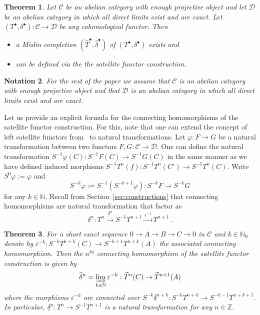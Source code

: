 \documentclass[12pt,a4paper]{article}
\numberwithin{equation}{section}
\newtheorem{thm}{Theorem}[section]
\newtheorem{notn}[thm]{Notation}
\theoremstyle{nonumberplain}
\begin{document}
\begin{thm}\label{thm:satellitemislin}
Let $\mathcal{C}$ be an abelian category with enough projective object and let $\mathcal{D}$ be an abelian category in which all direct limits exist and are exact. Let $(T^{\bullet}, \delta^{\bullet}): \mathcal{C} \rightarrow \mathcal{D}$ be any cohomological functor.  Then
\begin{itemize}
\item a Mislin completion $(\widehat{T}^{\bullet}, \widehat{\delta}^{\bullet})$ of $(T^{\bullet}, \delta^{\bullet})$ exists and
\item can be defined via the the satellite functor construction.
\end{itemize}
\end{thm}

\begin{notn}
For the rest of the paper we assume that $\mathcal{C}$ is an abelian category with enough projective object and that $\mathcal{D}$ is an abelian category in which all direct limits exist and are exact.
\end{notn}

Let us provide an explicit formula for the connecting homomorphisms of the satellite functor construction. For this, note that one can extend the concept of left satellite functors from~\cite[Corollary~5.3]{car56} to natural transformations. Let $\varphi: F \rightarrow G$ be a natural transformation between two functors $F, G: \mathcal{C} \rightarrow \mathcal{D}$. One can define the natural transformation $S^{-1}\varphi(C): S^{-1}F(C) \rightarrow S^{-1}G(C)$ in the same manner as we have defined induced morphisms $S^{-1}T^n(f): S^{-1}T^n(C') \rightarrow S^{-1}T^n(C)$. Write $S^0{\varphi} := \varphi$ and
\[ S^{-k}\varphi := S^{-1}(S^{-k+1}\varphi): S^{-k}F \rightarrow S^{-k}G \]
for any $k \in \mathbb{N}$. Recall from Section~\ref{sec:constructions} that connecting homomorphisms are natural transformation that factor as
\[ \delta^n: T^n \xrightarrow{\underline{\delta}^n} S^{-1}T^{n+1} \xrightarrow{\varepsilon^{-1}} T^{n+1} \, . \]

\begin{thm}\label{thm:satelliteconnmorphisms}
For a short exact sequence $0 \rightarrow A \rightarrow B \rightarrow C \rightarrow 0$ in $\mathcal{C}$ and $k \in \mathbb{N}_0$ denote by $\varepsilon^{-k}: S^{-k}T^{n+k}(C) \rightarrow S^{-k+1}T^{n+k}(A)$ the associated connecting homomorphism. Then the $n^{\text{th}}$ connecting homomorphism of the satellite functor construction is given by
\[ \widehat{\delta}^n = \varinjlim_{k \in \mathbb{N}} \varepsilon^{-k}: \widehat{T}^n(C) \rightarrow \widehat{T}^{n+1}(A) \]
where the morphisms $\varepsilon^{-k}$ are connected over $S^{-k}\underline{\delta}^{n+k}: S^{-k}T^{n+k} \rightarrow S^{-k-1}T^{n+k+1}$. In particular, $\underline{\delta}^n: T^n \rightarrow S^{-1}T^{n+1}$ is a natural transformation for any $n \in \mathbb{Z}$.
\end{thm}
\end{document}

